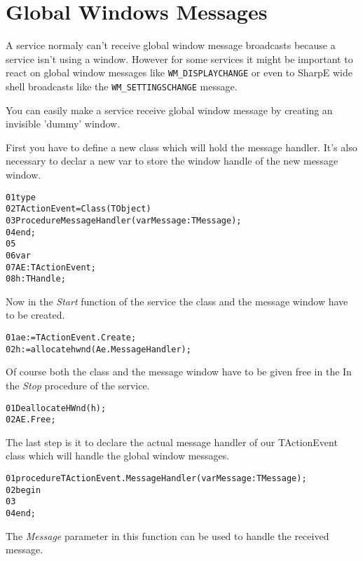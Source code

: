 \documentclass[a4paper]{article}
\begin{document}
\section{Global Windows Messages}
  A service normaly can't receive global window message broadcasts because a service isn't using a window. However for some services it might be important to react on global window messages like \verb+WM_DISPLAYCHANGE+ or even to SharpE wide shell broadcasts like the \verb+WM_SETTINGSCHANGE+ message.
  
  You can easily make a service receive global window message by creating an invisible 'dummy' window.
  
  First you have to define a new class which will hold the message handler. It's also necessary to declar a new var to store the window handle of the new message window.
  \begin{alltt}
01  type
02    TActionEvent = Class(TObject)
03      Procedure MessageHandler(var Message: TMessage);
04    end;
05
06  var
07    AE:TActionEvent;
08    h:THandle;
  \end{alltt}
  
  Now in the {\it Start} function of the service the class and the message window have to be created.
  \begin{alltt}
01  ae := TActionEvent.Create;
02  h := allocatehwnd(Ae.MessageHandler);
  \end{alltt}

  Of course both the class and the message window have to be given free in the In the {\it Stop} procedure of the service.
  \begin{alltt}
01  DeallocateHWnd(h);
02  AE.Free;
  \end{alltt}  
  
  The last step is it to declare the actual message handler of our TActionEvent class which will handle the global window messages.
  \begin{alltt}
01  procedure TActionEvent.MessageHandler(var Message: TMessage);
02  begin
03
04  end;
  \end{alltt}
  The {\it Message} parameter in this function can be used to handle the received message.
   
\end{document}
